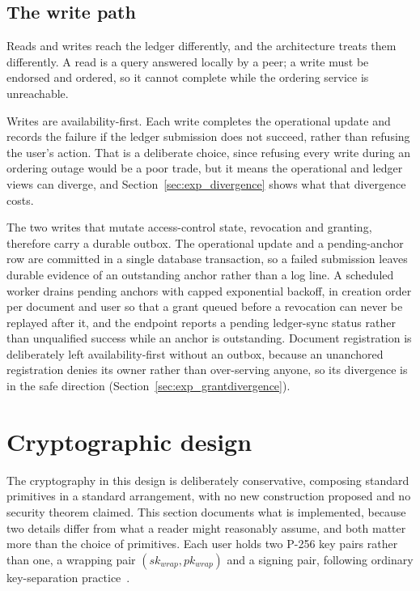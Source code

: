 \documentclass[preprint,12pt]{elsarticle}
\begin{document}
\subsection{The write path}
\label{sec:writepath}

Reads and writes reach the ledger differently, and the architecture treats them
differently. A read is a query answered locally by a peer; a write must be
endorsed and ordered, so it cannot complete while the ordering service is
unreachable.

Writes are availability-first. Each write completes the operational update and
records the failure if the ledger submission does not succeed, rather than
refusing the user's action. That is a deliberate choice, since refusing every
write during an ordering outage would be a poor trade, but it means the
operational and ledger views can diverge, and
Section~\ref{sec:exp_divergence} shows what that divergence costs.

The two writes that mutate access-control state, revocation and granting,
therefore carry a durable outbox. The operational update and a pending-anchor
row are committed in a single database transaction, so a failed submission
leaves durable evidence of an outstanding anchor rather than a log line. A
scheduled worker drains pending anchors with capped exponential backoff, in
creation order per document and user so that a grant queued before a revocation
can never be replayed after it, and the endpoint reports a pending ledger-sync
status rather than unqualified success while an anchor is outstanding. Document
registration is deliberately left availability-first without an outbox, because
an unanchored registration denies its owner rather than over-serving anyone,
so its divergence is in the safe direction
(Section~\ref{sec:exp_grantdivergence}).


\section{Cryptographic design}
\label{sec:crypto}

The cryptography in this design is deliberately conservative, composing
standard primitives in a standard arrangement, with no new construction
proposed and no security theorem claimed. This section documents what is
implemented, because two details differ from what a reader might reasonably
assume, and both matter more than the choice of primitives. Each user holds two
P-256 key pairs rather than one, a wrapping pair $(sk_{wrap}, pk_{wrap})$ and a
signing pair, following ordinary key-separation
practice~\cite{nist800131a}.
\end{document}
